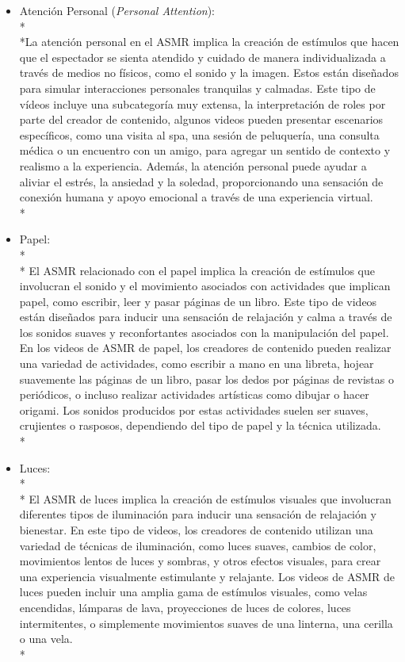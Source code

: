 \documentclass[a4paper,12pt,twoside]{memoir}
\begin{document}
\begin{itemize}
\begin{itemize}
    \item Atención Personal (\textit{Personal Attention}):\\*\\*La atención personal en el ASMR implica la creación de estímulos que hacen que el espectador se sienta atendido y cuidado de manera individualizada a través de medios no físicos, como el sonido y la imagen. Estos están diseñados para simular interacciones personales tranquilas y calmadas. Este tipo de vídeos incluye una subcategoría muy extensa, la interpretación de roles por parte del creador de contenido, algunos videos pueden presentar escenarios específicos, como una visita al spa, una sesión de peluquería, una consulta médica o un encuentro con un amigo, para agregar un sentido de contexto y realismo a la experiencia. Además, la atención personal puede ayudar a aliviar el estrés, la ansiedad y la soledad, proporcionando una sensación de conexión humana y apoyo emocional a través de una experiencia virtual.\\*
    \item Papel:\\*\\* El ASMR relacionado con el papel implica la creación de estímulos que involucran el sonido y el movimiento asociados con actividades que implican papel, como escribir, leer y pasar páginas de un libro. Este tipo de videos están diseñados para inducir una sensación de relajación y calma a través de los sonidos suaves y reconfortantes asociados con la manipulación del papel. En los videos de ASMR de papel, los creadores de contenido pueden realizar una variedad de actividades, como escribir a mano en una libreta, hojear suavemente las páginas de un libro, pasar los dedos por páginas de revistas o periódicos, o incluso realizar actividades artísticas como dibujar o hacer origami. Los sonidos producidos por estas actividades suelen ser suaves, crujientes o rasposos, dependiendo del tipo de papel y la técnica utilizada.\\*
    \item Luces:\\*\\* El ASMR de luces implica la creación de estímulos visuales que involucran diferentes tipos de iluminación para inducir una sensación de relajación y bienestar. En este tipo de videos, los creadores de contenido utilizan una variedad de técnicas de iluminación, como luces suaves, cambios de color, movimientos lentos de luces y sombras, y otros efectos visuales, para crear una experiencia visualmente estimulante y relajante. Los videos de ASMR de luces pueden incluir una amplia gama de estímulos visuales, como velas encendidas, lámparas de lava, proyecciones de luces de colores, luces intermitentes, o simplemente movimientos suaves de una linterna, una cerilla o una vela.\\*


\end{itemize}
\end{itemize}
\end{document}
